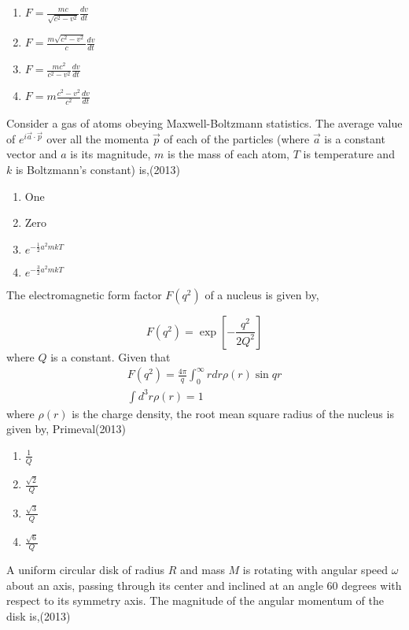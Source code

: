    \begin{multicols}{4}
			\begin{enumerate}
\item $F=\frac{m c}{\sqrt{c^{2}-v^{2}}} \frac{d v}{d t}$
\item $ F=\frac{m \sqrt{c^{2}-v^{2}}}{c} \frac{d v}{d t}$
\item  $F=\frac{m c^{2}}{c^{2}-v^{2}} \frac{d v}{d t}$
\item  $F=m \frac{{c}^{2}-{v}^{2}}{{c}^{2}} \frac{d v}{d t}$
   \end{enumerate}
		\end{multicols}
  \item Consider a gas of atoms obeying Maxwell-Boltzmann statistics. The average value of $e^{i \vec{a} \cdot \vec{p}}$ over all the momenta $\vec{p}$ of each of the particles (where $\vec{a}$ is a constant vector and $a$ is its magnitude, $m$ is the mass of each atom, $T$ is temperature and $k$ is Boltzmann's constant) is,\hfill{(2013)}

   \begin{multicols}{4}
			\begin{enumerate}
   \item  One
\item Zero
\item $e^{-\frac{1}{2} a^{2} m k T}$
\item $e^{-\frac{3}{2} a^{2} m k T}$
\end{enumerate}
		\end{multicols}
  \item The electromagnetic form factor $F(q^{2})$ of a nucleus is given by,

$$
F(q^{2})=\exp [-\frac{q^{2}}{2 Q^{2}}]
$$
where $Q$ is a constant. Given that
$$
\begin{gathered}
F(q^{2})=\frac{4 \pi}{q} \int_{0}^{\infty} r d r \rho(r) \sin q r \\
\int d^{3} r \rho(r)=1
\end{gathered}
$$
where $\rho(r)$ is the charge density, the root mean square radius of the nucleus is given by,
  Primeval\hfill{(2013)}

   \begin{multicols}{4}
			\begin{enumerate}
   \item $\frac{1} { Q}$
\item $\frac{\sqrt{2}}  {Q}$
\item$\frac{\sqrt{3}} { Q}$
\item $\frac{\sqrt{6}} { Q}$
\end{enumerate}
		\end{multicols}
  \item  A uniform circular disk of radius $R$ and mass $M$ is rotating with angular speed $\omega$ about an axis, passing through its center and inclined at an angle 60 degrees with respect to its symmetry axis. The magnitude of the angular momentum of the disk is,\hfill{(2013)}

